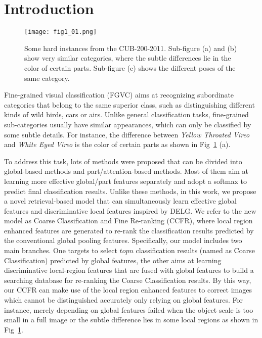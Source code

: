 \documentclass[10pt,twocolumn,letterpaper]{article}
\begin{document}
\section{Introduction}
\begin{figure}[t]
\begin{center}
\texttt{[image: fig1\_01.png]}
\end{center}
   \caption{Some hard instances from the CUB-200-2011\cite{wah2011caltech}. Sub-figure (a) and (b) show very similar categories, where the subtle differences lie in the color of certain parts. Sub-figure (c) shows the different poses of the same category.}
\label{fig1}
\end{figure}
Fine-grained visual classification (FGVC) aims at recognizing subordinate categories that belong to the same superior class, such as distinguishing different kinds of wild birds\cite{wah2011caltech}, cars\cite{krause20133d} or airs\cite{maji2013fine}. Unlike general classification tasks, fine-grained sub-categories usually have similar appearances, which can only be classified by some subtle details. For instance, the difference between \textit{Yellow Throated Vireo} and \textit{White Eyed Vireo} is the color of certain parts as shown in Fig~\ref{fig1} (a). 

To address this task, lots of methods were proposed that can be divided into global-based methods\cite{li2017dynamic,cui2018large, SimonRDD20} and part/attention-based methods\cite{YangLWHGW18,GeLY19,korsch2019classification,du2020fine,abs-2004-02684,ZhuangW020}. 
Most of them aim at learning more effective global/part features separately and adopt a softmax to predict final classification results. Unlike these methods, in this work, we propose a novel retrieval-based model that can simultaneously learn effective global features and discriminative local features inspired by DELG\cite{DBLP:journals/corr/abs-2001-05027}. We refer to the new model as Coarse Classification and Fine Re-ranking (CCFR), where local region enhanced features are generated to re-rank the classification results predicted by the conventional global pooling features. Specifically, our model includes two main branches. One targets to select $topn$ classification results (named as Coarse Classification) predicted by global features, the other aims at learning discriminative local-region features that are fused with global features to build a searching database for re-ranking the Coarse Classification results. By this way, our CCFR can make use of the local region enhanced features to correct images which cannot be distinguished accurately only relying on global features. For instance, merely depending on global features failed when the object scale is too small in a full image or the subtle difference lies in some local regions as shown in Fig~\ref{fig1}. 
\end{document}
